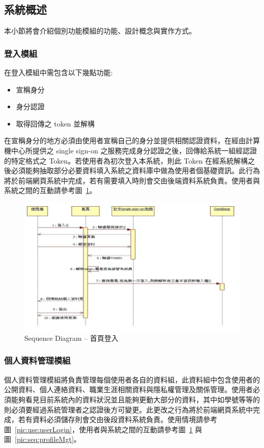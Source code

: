 \subsection{系統概述}

本小節將會介紹個別功能模組的功能、設計概念與實作方式。

\subsubsection{登入模組}
在登入模組中需包含以下幾點功能: 
\begin{itemize}
\item{宣稱身分}
\item{身分認證}
\item{取得回傳之 token 並解構}
\end{itemize}
在宣稱身分的地方必須由使用者宣稱自己的身分並提供相關認證資料，在經由計算機中心所提供之 single sign-on 之服務完成身分認證之後，回傳給系統一組經認證的特定格式之 Token。若使用者為初次登入本系統，則此 Token 在經系統解構之後必須能夠抽取部分必要資料填入系統之資料庫中做為使用者個基礎資訊。此行為將於前端網頁系統中完成，若有需要填入時則會交由後端資料系統負責。使用者與系統之間的互動請參考圖~\ref{pic:seq:login}。

\begin{figure}[h]
\centering
\includegraphics[width=\textwidth]{img/seq01.png}
\caption{Sequence Diagram -- 首頁登入}
\label{pic:seq:login}
\end{figure}

\subsubsection{個人資料管理模組}
\label{sssec:userprofile}
個人資料管理模組將負責管理每個使用者各自的資料組，此資料組中包含使用者的公開資料、個人連絡資料、職業生涯相關資料與隱私權管理及關係管理。使用者必須能夠看見目前系統內的資料狀況並且能夠更動大部分的資料，其中如學號等等的則必須要經過系統管理者之認證後方可變更。此更改之行為將於前端網頁系統中完成，若有資料必須儲存則會交由後段資料系統負責。使用情境請參考圖~\ref{pic:use:userLogin}，使用者與系統之間的互動請參考圖~\ref{pic:seq:login} 與圖~\ref{pic:seq:profileMgt}。

